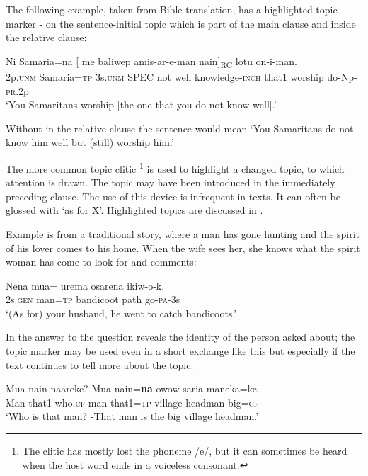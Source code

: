 The following example, taken from Bible translation, has a highlighted topic marker - on the sentence-initial topic  which is part of the main clause\textstyleAcronymallcaps{,} and  inside the relative clause:

\ea%
\label{ex:3:x1816}
\gll Ni Samaria=na [  me baliwep amis-ar-e-man nain]\textsubscript{RC} lotu on-i-man.\\
2p.\textsc{unm} Samaria=\textsc{tp} 3s.\textsc{unm} SPEC not well knowledge-\textsc{inch} that1 worship do-Np-\textsc{pr}.2p\\
\glt`You Samaritans worship [the one that you do not know well].'
\z

Without  in the relative clause the sentence would mean `You Samaritans do not know him well but (still) worship him.'

The more common topic clitic \footnote{The clitic has mostly lost the phoneme /e/, but it can sometimes be heard when the host word ends in a voiceless consonant. } is used to highlight a changed topic, to which attention is drawn. The topic may have been introduced in the immediately preceding clause. The use of this device is infrequent in texts. It can often be glossed with `as for X'. Highlighted topics are discussed in .

Example  is from a traditional story, where a man has gone hunting and the spirit of his lover comes to his home. When the wife sees her, she knows what the spirit woman has come to look for and comments:

\ea%
\label{ex:3:x779}
\gll Nena mua= urema osarena ikiw-o-k. \\
2s.\textsc{gen} man=\textsc{tp} bandicoot path go-\textsc{pa}-3s\\
\glt`(As for) your husband, he went to catch bandicoots.'
\z

In  the answer to the question reveals the identity of the person asked about; the topic marker may be used even in a short exchange like this but especially if the text continues to tell more about the topic. 

\ea%
\label{ex:3:x1751}
\gll Mua nain naareke? Mua nain=\textbf{na} owow saria maneka=ke. \\
Man that1 who.\textsc{cf} man that1=\textsc{tp} village headman big=\textsc{cf}\\
\glt`Who is that man? -That man is the big village headman.'
\z


